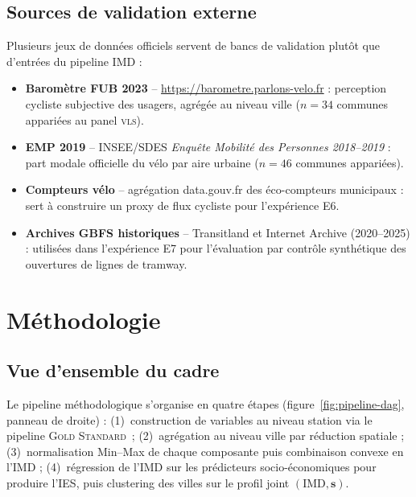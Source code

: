 \documentclass[11pt,a4paper]{article}
\newcommand{\IMD}{\mathrm{IMD}}
\newcommand{\VLS}{\textsc{vls}\xspace}
\newcommand{\GS}{\textsc{Gold Standard}\xspace}
\begin{document}
\subsection{Sources de validation externe}

Plusieurs jeux de données officiels servent de bancs de
validation plutôt que d'entrées du pipeline IMD :

\begin{itemize}[leftmargin=*,itemsep=0.3em]
    \item \textbf{Baromètre FUB 2023} --
    \url{https://barometre.parlons-velo.fr} : perception
    cycliste subjective des usagers, agrégée au niveau ville
    ($n=34$ communes appariées au panel \VLS).
    \item \textbf{EMP 2019} -- INSEE/SDES
    \emph{Enquête Mobilité des Personnes 2018--2019} : part
    modale officielle du vélo par aire urbaine ($n=46$ communes
    appariées).
    \item \textbf{Compteurs vélo} -- agrégation data.gouv.fr des
    éco-compteurs municipaux : sert à construire un proxy de flux
    cycliste pour l'expérience E6.
    \item \textbf{Archives GBFS historiques} -- Transitland et
    Internet Archive (2020--2025) : utilisées dans l'expérience
    E7 pour l'évaluation par contrôle synthétique des ouvertures
    de lignes de tramway.
\end{itemize}

\section{Méthodologie}
\label{sec:method}

\subsection{Vue d'ensemble du cadre}

Le pipeline méthodologique s'organise en quatre étapes
(figure~\ref{fig:pipeline-dag}, panneau de droite) :
(1)~construction de variables au niveau station via le pipeline
\GS\ ; (2)~agrégation au niveau ville par réduction spatiale ;
(3)~normalisation Min--Max de chaque composante puis combinaison
convexe en l'IMD ; (4)~régression de l'IMD sur les prédicteurs
socio-économiques pour produire l'IES, puis clustering des villes
sur le profil joint $(\IMD, \mathbf{s})$.
\end{document}
